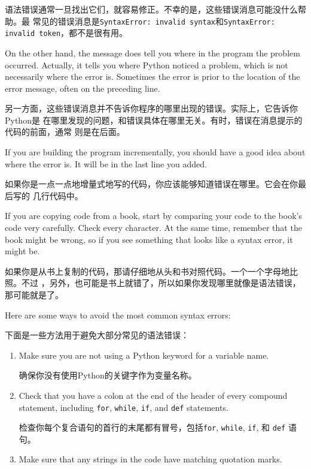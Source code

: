 \documentclass[10pt]{book}
\begin{document}
\begin{CJK}{UTF8}{gbsn}
语法错误通常一旦找出它们，就容易修正。不幸的是，这些错误消息可能没什么帮助。最
常见的错误消息是{\tt SyntaxError: invalid syntax}和{\tt SyntaxError: invalid
token}，都不是很有用。

On the other hand, the message does tell you where in the program the
problem occurred.  Actually, it tells you where Python
noticed a problem, which is not necessarily where the error
is.  Sometimes the error is prior to the location of the error
message, often on the preceding line.

另一方面，这些错误消息并不告诉你程序的哪里出现的错误。实际上，它告诉你Python是
在哪里发现的问题，和错误具体在哪里无关。有时，错误在消息提示的代码的前面，通常
则是在后面。

If you are building the program incrementally, you should have
a good idea about where the error is.  It will be in the last
line you added.

如果你是一点一点地增量式地写的代码，你应该能够知道错误在哪里。它会在你最后写的
几行代码中。

If you are copying code from a book, start by comparing
your code to the book's code very carefully.  Check every character.
At the same time, remember that the book might be wrong, so
if you see something that looks like a syntax error, it might be.

如果你是从书上复制的代码，那请仔细地从头和书对照代码。一个一个字母地比照。不过
，另外，也可能是书上就错了，所以如果你发现哪里就像是语法错误，那可能就是了。

Here are some ways to avoid the most common syntax errors:

下面是一些方法用于避免大部分常见的语法错误：

\begin{enumerate}

\item Make sure you are not using a Python keyword for a variable name.

确保你没有使用Python的关键字作为变量名称。

\item Check that you have a colon at the end of the header of every
compound statement, including {\tt for}, {\tt while},
{\tt if}, and {\tt def} statements.

检查你每个复合语句的首行的末尾都有冒号，包括{\tt for}, {\tt while},
{\tt if}, 和 {\tt def} 语句。

\item Make sure that any strings in the code have matching
quotation marks.


\end{enumerate}
\end{CJK}
\end{document}
